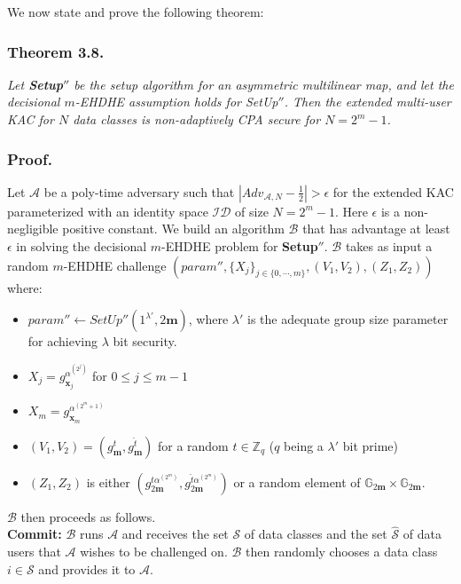 We now state and prove the following theorem:

\subsubsection{Theorem 3.8.} \textit{Let \textbf{Setup}$''$ be the setup algorithm for an asymmetric multilinear map, and let the decisional $m$-EHDHE assumption holds for {SetUp}$''$. Then the extended multi-user KAC for $N$ data classes is non-adaptively CPA secure for $N=2^m-1$.}

\subsubsection{Proof.} Let $\mathcal{A}$ be a poly-time adversary such that $|Adv_{\mathcal{A},N}-\frac{1}{2}| > \epsilon$ for the extended KAC parameterized with an identity space $\mathcal{ID}$ of size $N=2^m-1$. Here $\epsilon$ is a non-negligible positive constant. We build an algorithm $\mathcal{B}$ that has advantage at least $\epsilon$ in solving the decisional $m$-EHDHE problem for \textbf{Setup}$''$. $\mathcal{B}$ takes as input a random $m$-EHDHE challenge $(param'',\{X_j\}_{j\in\{0,\cdots,m\}},(V_1,V_2),(Z_1,Z_2))$ where:
\begin{itemize}
 \item $param''\leftarrow SetUp''(1^{\lambda'},2\mathbf{m})$, where $\lambda'$ is the adequate group size parameter for achieving $\lambda$ bit security.
 \item $X_j=g^{\alpha^{(2^j)}}_{\mathbf{x}_j}$ for $0\leq j \leq m-1$
 \item $X_m=g^{\alpha^{(2^m+1)}}_{\mathbf{x}_m}$
 \item $(V_1,V_2)=\left(g^{t}_{\mathbf{m}},g^{\hat{t}}_{\mathbf{m}}\right)$ for a random $t\in\mathbb{Z}_q$ ($q$ being a $\lambda'$ bit prime)
 \item $(Z_1,Z_2)$ is either $\left(g^{t\alpha^{(2^m)}}_{2\mathbf{m}},g^{\hat{t}\alpha^{(2^m)}}_{2\mathbf{m}}\right)$ or a random element of $\mathbb{G}_{2\mathbf{m}}\times\mathbb{G}_{2\mathbf{m}}$.
\end{itemize}
\noindent $\mathcal{B}$ then proceeds as follows.\\

\noindent \textbf{Commit:} $\mathcal{B}$ runs $\mathcal{A}$ and receives the set $\mathcal{S}$ of data classes and the set $\hat{\mathcal{S}}$ of data users that $\mathcal{A}$ wishes to be challenged on. $\mathcal{B}$ then randomly chooses a data class $i\in\mathcal{S}$ and provides it to $\mathcal{A}$.\\
 
